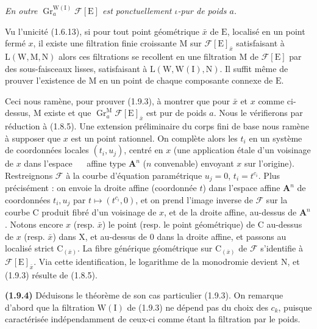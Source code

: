 \documentclass[11pt,leqno]{article}
\newcommand{\Page}[1]{\ifvmode\noindent\else\unskip\ \fi{\footnotesize\textcolor{gray}{[p.\,#1]}}\ \ignorespaces}
\begin{document}
\textit{En outre \(\operatorname{Gr}_a^{\mathrm{W}(\mathrm{I})}\mathscr{F}[\mathrm{E}]\) est ponctuellement \(\iota\)-pur de poids \(a\).}

Vu l’unicité (1.6.13), si pour tout point géométrique \(\bar{x}\) de \(\mathrm{E}\), localisé en un point fermé \(x\), il existe une filtration finie croissante \(\mathrm{M}\) sur \(\mathscr{F}[\mathrm{E}]_{\bar{x}}\) satisfaisant à \(\mathrm{L}(\mathrm{W},\mathrm{M},\mathrm{N})\) alors ces filtrations se recollent en une filtration \(\mathrm{M}\) de \(\mathscr{F}[\mathrm{E}]\) par des sous-faisceaux lisses, satisfaisant à \(\mathrm{L}(\mathrm{W},\mathrm{W}(\mathrm{I}),\mathrm{N})\). Il suffit même de prouver l’existence de \(\mathrm{M}\) en un point de chaque composante connexe de \(\mathrm{E}\).

Ceci nous ramène, pour prouver (1.9.3), à montrer que pour \(\bar{x}\) et \(x\) comme ci-dessus, \(\mathrm{M}\) existe et que \(\operatorname{Gr}_a^{\mathrm{M}}\mathscr{F}[\mathrm{E}]_{\bar{x}}\) est pur de poids \(a\). Nous le vérifierons par réduction à (1.8.5). Une extension préliminaire du corps fini de base nous ramène à supposer que \(x\) est un point rationnel. On complète alors les \(t_i\) en un système de coordonnées locales \((t_i,u_j)\), centré en \(x\) (une application étale d’un voisinage de \(x\) dans l’espace
\Page{181}
affine type \(\mathbf{A}^n\) (\(n\) convenable) envoyant \(x\) sur l’origine). Restreignons \(\mathscr{F}\) à la courbe d’équation paramétrique \(u_j=0\), \(t_i=t^{c_i}\). Plus précisément : on envoie la droite affine (coordonnée \(t\)) dans l’espace affine \(\mathbf{A}^n\) de coordonnées \(t_i,u_j\) par \(t\mapsto(t^{c_i},0)\), et on prend l’image inverse de \(\mathscr{F}\) sur la courbe \(\mathrm{C}\) produit fibré d’un voisinage de \(x\), et de la droite affine, au-dessus de \(\mathbf{A}^n\). Notons encore \(x\) (resp. \(\bar{x}\)) le point (resp. le point géométrique) de \(\mathrm{C}\) au-dessus de \(x\) (resp. \(\bar{x}\)) dans \(\mathrm{X}\), et au-dessus de \(0\) dans la droite affine, et passons au localisé strict \(\mathrm{C}_{(\bar{x})}\). La fibre générique géométrique sur \(\mathrm{C}_{(\bar{x})}\) de \(\mathscr{F}\) s’identifie à \(\mathscr{F}[\mathrm{E}]_{\bar{x}}\). Via cette identification, le logarithme de la monodromie devient \(\mathrm{N}\), et (1.9.3) résulte de (1.8.5).

\textbf{(1.9.4)} Déduisons le théorème de son cas particulier (1.9.3). On remarque d’abord que la filtration \(\mathrm{W}(\mathrm{I})\) de (1.9.3) ne dépend pas du choix des \(c_k\), puisque caractérisée indépendamment de ceux-ci comme étant la filtration par le poids.
\end{document}
